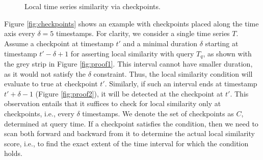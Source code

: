 \begin{figure}[!t]
 \centering
  \\
  \\
 \vspace{-10pt} 
 \caption{Local time series similarity via checkpoints.}
 \label{fig:proof}
\end{figure}

Figure \ref{fig:checkpoints} shows an example with checkpoints placed along the time axis every $\delta=5$ timestamps. For clarity, we consider a single time series $T$. Assume a checkpoint at timestamp $t'$ and a minimal duration $\delta$ starting at timestamp $t'-\delta+1$ for asserting local similarity with query $T_q$, as shown with the grey strip in Figure \ref{fig:proof1}. This interval cannot have smaller duration, as it would not satisfy the $\delta$ constraint. Thus, the local similarity condition will evaluate to true at checkpoint $t'$. Similarly, if such an interval ends at timestamp $t'+\delta-1$ (Figure \ref{fig:proof2}), it will be detected at the checkpoint at $t'$. This observation entails that it suffices to check for local similarity only at checkpoints, i.e., every $\delta$ timestamps. We denote the set of checkpoints as $C$, determined at query time. If a checkpoint satisfies the condition, then we need to scan both forward and backward from it to determine the actual local similarity score, i.e., to find the exact extent of the time interval for which the condition holds.

